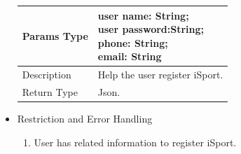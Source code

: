 \documentclass[16pt]{scrreprt}
\begin{document}
\begin{itemize}
\begin{center}
\begin{tabular}{p{5cm}p{10cm}}
        \hline
        Params Type & \makecell[l]{user name: String;\\user password:String;\\ phone: String;\\email: String}\\
        \hline
        Description & Help the user register iSport.\\
        \hline
        Return Type & Json.\\
        \hline
    \end{tabular}
\end{center}
\item Restriction and Error Handling\\
\begin{enumerate}
    \item User has related information to register iSport.
\end{enumerate} 
\end{itemize}
\end{document}
